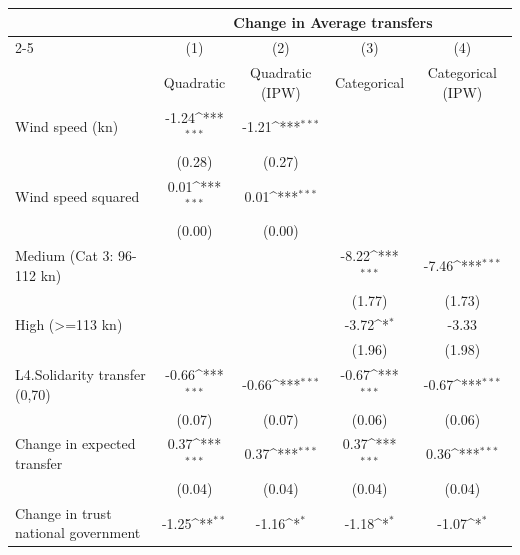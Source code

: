 {
\def\sym#1{\ifmmode^{#1}\else\(^{#1}\)\fi}
\begin{tabular}{l*{4}{c}}
\toprule
                    &\multicolumn{4}{c}{Change in Average transfers}                                        \\\cmidrule(lr){2-5}
                    &\multicolumn{1}{c}{(1)}&\multicolumn{1}{c}{(2)}&\multicolumn{1}{c}{(3)}&\multicolumn{1}{c}{(4)}\\
                    &\multicolumn{1}{c}{Quadratic}&\multicolumn{1}{c}{Quadratic (IPW)}&\multicolumn{1}{c}{Categorical}&\multicolumn{1}{c}{Categorical (IPW)}\\
\midrule
Wind speed (kn)     &       -1.24\sym{***}&       -1.21\sym{***}&                     &                     \\
                    &      (0.28)         &      (0.27)         &                     &                     \\
Wind speed squared  &        0.01\sym{***}&        0.01\sym{***}&                     &                     \\
                    &      (0.00)         &      (0.00)         &                     &                     \\
Medium (Cat 3: 96-112 kn)&                     &                     &       -8.22\sym{***}&       -7.46\sym{***}\\
                    &                     &                     &      (1.77)         &      (1.73)         \\
High (>=113 kn)     &                     &                     &       -3.72\sym{*}  &       -3.33         \\
                    &                     &                     &      (1.96)         &      (1.98)         \\
L4.Solidarity transfer (0,70)&       -0.66\sym{***}&       -0.66\sym{***}&       -0.67\sym{***}&       -0.67\sym{***}\\
                    &      (0.07)         &      (0.07)         &      (0.06)         &      (0.06)         \\
Change in expected transfer&        0.37\sym{***}&        0.37\sym{***}&        0.37\sym{***}&        0.36\sym{***}\\
                    &      (0.04)         &      (0.04)         &      (0.04)         &      (0.04)         \\
Change in trust national government&       -1.25\sym{**} &       -1.16\sym{*}  &       -1.18\sym{*}  &       -1.07\sym{*}  \\

\end{tabular}}
